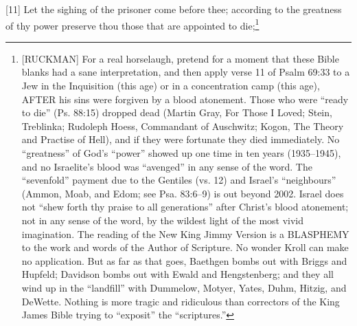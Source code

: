 [11] \textcolor[rgb]{0.00,0.00,1.00}{Let the sighing of the prisoner come before thee; according to the greatness of thy power preserve thou those that are appointed to die;}\footnote{[RUCKMAN] For a real horselaugh, pretend for a moment that these Bible blanks had a sane interpretation, and then apply verse 11 of Psalm 69:33 to a Jew in the Inquisition (this age) or in a concentration camp (this age), AFTER his sins were forgiven by a blood atonement. Those who were “ready to die” (Ps. 88:15) dropped dead (Martin Gray, For Those I Loved; Stein, Treblinka; Rudoleph Hoess, Commandant of Auschwitz; Kogon, The Theory and Practise of Hell), and if they were fortunate they died immediately. No “greatness” of God’s “power” showed up one time in ten years (1935--1945), and no Israelite’s blood was “avenged” in any sense of the word. The “sevenfold” payment due to the Gentiles (vs. 12) and Israel’s “neighbours” (Ammon, Moab, and Edom; see Psa. 83:6--9) is out beyond 2002. Israel does not “shew forth thy praise to all generations” after Christ’s blood atonement;  not in any sense of the word, by the wildest light of the most vivid imagination. The reading of the New King Jimmy Version is a BLASPHEMY to the work and words of the Author of Scripture. No wonder Kroll can make no application. But as far as that goes, Baethgen bombs out with Briggs and Hupfeld; Davidson bombs out with Ewald and Hengstenberg; and they all wind up in the “landfill” with Dummelow, Motyer, Yates, Duhm, Hitzig, and DeWette. Nothing is more tragic and ridiculous than correctors of the King James Bible trying to “exposit” the “scriptures.”\cite{Ruckman1992Psalms}}
